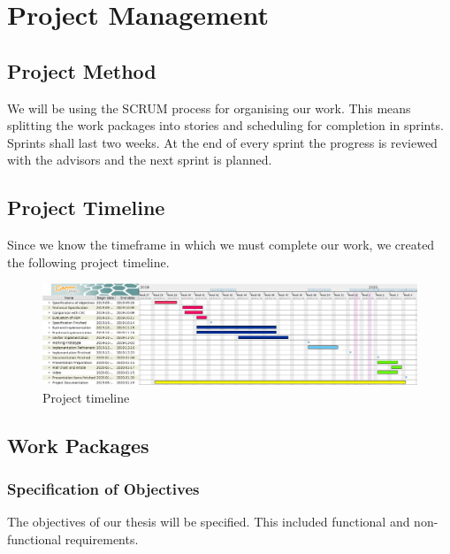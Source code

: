 \chapter{Project Management}
\label{ch:projectmanagement}

\section{Project Method}
\label{sec:projectmethod}
We will be using the SCRUM process for organising our work.
This means splitting the work packages into stories and scheduling for completion in sprints.
Sprints shall last two weeks.
At the end of every sprint the progress is reviewed with the advisors and the next sprint is planned.

\section{Project Timeline}
\label{sec:projecttimeline}
Since we know the timeframe in which we must complete our work, we created the following project timeline.

\begin{landscape}
\vspace*{\fill}
	\begin{figure}[H]
	\begin{center}
		\includegraphics[scale=0.5]{images/Projectplan.png}
		\caption{Project timeline}
		\label{fig:projecttimeline}
	\end{center}
	\end{figure}
\vspace*{\fill}
\end{landscape}

\section{Work Packages}
\label{sec:workpackages}

\subsection{Specification of Objectives}\label{subsec:specification-of-objectives}
The objectives of our thesis will be specified.
This included functional and non-functional requirements.

